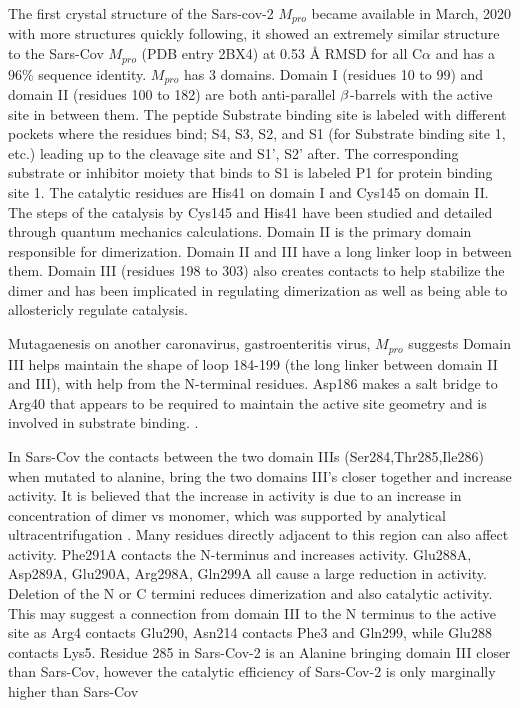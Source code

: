 \documentclass{biophys-new}
\begin{document}
The first crystal structure of the Sars-cov-2 $M_{pro}$ became available in March, 2020 \cite{Zhang409} with more structures quickly following\cite{owen2020sars}\cite{jin2020structure}, it showed an extremely similar structure to the Sars-Cov $M_{pro}$ (PDB entry 2BX4)\cite{tan2005ph} at 0.53 Å RMSD for all C$\alpha$ and has a 96\% sequence identity\cite{Zhang409}. $M_{pro}$ has 3 domains. Domain I (residues 10 to 99) and domain II (residues 100 to 182) are both anti-parallel $\MakeUppercase{\beta}$-barrels with the active site in between them. The peptide Substrate binding site is labeled with different pockets where the residues bind; S4, S3, S2, and S1 (for Substrate binding site 1, etc.) leading up to the cleavage site and S1', S2' after. The corresponding substrate or inhibitor moiety that binds to S1 is labeled P1 for protein binding site 1. The catalytic residues are His41 on domain I and Cys145 on domain II. The steps of the catalysis by Cys145 and His41 have been studied and detailed through quantum mechanics calculations. \cite{swiderek2020revealing} Domain II is the primary domain responsible for dimerization. Domain II and III have a long linker loop in between them. Domain III (residues 198 to 303) also creates contacts to help stabilize the dimer and has been implicated in regulating dimerization as well as being able to allostericly regulate catalysis.

Mutagaenesis on another caronavirus, gastroenteritis virus, $M_{pro}$ suggests Domain III helps maintain the shape of loop 184-199 (the long linker between domain II and III), with help from the N-terminal residues. Asp186 makes a salt bridge to Arg40 that appears to be required to maintain the active site geometry and is involved in substrate binding. \cite{anand2002structure}.

In Sars-Cov the contacts between the two domain IIIs (Ser284,Thr285,Ile286) when mutated to alanine, bring the two domains III's closer together and increase activity.\cite{shi2006catalysis} It is believed that the increase in activity is due to an increase in concentration of dimer vs monomer, which was supported by analytical ultracentrifugation \cite{hsu2005critical}. Many residues directly adjacent to this region can also affect activity. Phe291A contacts the N-terminus and increases activity. Glu288A, Asp289A, Glu290A, Arg298A, Gln299A all cause a large reduction in activity. Deletion of the N or C termini reduces dimerization and also catalytic activity.\cite{shi2006catalysis}\cite{shi2004dissection} This may suggest a connection from domain III to the N terminus to the active site as Arg4 contacts Glu290, Asn214 contacts Phe3 and Gln299, while Glu288 contacts Lys5. Residue 285 in Sars-Cov-2 is an Alanine bringing domain III closer than Sars-Cov, however the catalytic efficiency of Sars-Cov-2 is only marginally higher than Sars-Cov \cite{Zhang409} 
\end{document}
